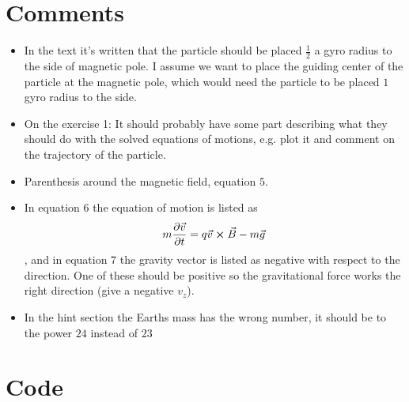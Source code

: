 \documentclass[x11names]{article}
\renewcommand{\va}{\vec}
\begin{document}
\appendix
\section{Comments}
  \begin{itemize}
    \item In the text it's written that the particle should be placed \(\frac{1}{2}\) a gyro radius to the side of magnetic pole. I assume we want to place the guiding center of the particle at the magnetic pole, which would need the particle to be placed \(1\) gyro radius to the side.
    \item On the exercise 1: It should probably have some part describing what they should do with the solved equations of motions, e.g. plot it and comment on the trajectory of the particle.
    \item Parenthesis around the magnetic field, equation \(5\).
    \item In equation \(6\) the equation of motion is listed as 
    \[m\pdv{\va{v}}{t} = q\va{v} \cross \va{B} - m \va{g}\]
    , and in equation \(7\) the gravity vector is listed as negative with respect to the direction.
    One of these should be positive so the gravitational force works the right direction (give a negative \(v_z\)).
    \item In the hint section the Earths mass has the wrong number, it should be to the power \(24\) instead of \(23\)
  \end{itemize}

\section{Code}
  \label{sec:code}
  
\end{document}
